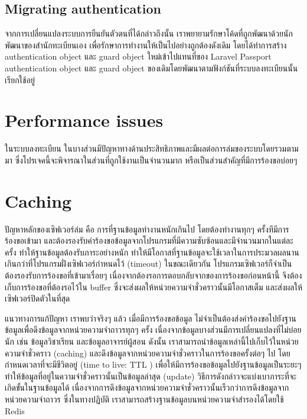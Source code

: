 \subsection{Migrating authentication}
จากการเปลี่ยนแปลงระบบการยืนยันตัวตนที่ได้กล่าวถึงนั้น เราพยายามรักษาโค้ดที่ถูกพัฒนาด้วยนักพัฒนาของสำนักทะเบียนเอง เพื่อรักษาการทำงานให้เป็นไปอย่างถูกต้องดังเดิม โดยได้ทำการสร้าง authentication object และ guard object ใหม่เข้าไปแทนที่ของ Laravel Passport authentication object และ guard object ของเดิมโดยพัฒนาตามฟังก์ชันที่ระบบลงทะเบียนนั้นเรียกใช้อยู่

\section{Performance issues}
ในระบบลงทะเบียน ในบางส่วนมีปัญหาทางด้านประสิทธิภาพและมีผลต่อการล่มของระบบโดยรวมตามมา ซึ่งโปรเจคนี้จะพิจารณาในส่วนที่ถูกใช้งานเป็นจำนวนมาก หรือเป็นส่วนสำคัญที่มีการร้องขอบ่อยๆ

\section{Caching}

ปัญหาหลักของเซิฟเวอร์ล่ม คือ การที่ฐานข้อมูลทำงานหนักเกินไป โดยต้องทำงานทุกๆ ครั้งทีมีการร้องขอเข้ามา และต้องรองรับคำร้องขอข้อมูลจากโปรแกรมที่มีความซับซ้อนและมีจำนวนมากในแต่ละครั้ง ทำให้ฐานข้อมูลต้องรับภาระอย่างหนัก 
ทำให้มีโอกาสที่ฐานข้อมูลจะใช้เวลาในการประมวลผลนานเกินกว่าที่โปรแกรมฝั่งเซิฟเวอร์กำหนดไว้ (timeout) ในขณะเดียวกัน โปรแกรมเซิฟเวอร์ก็จำเป็นต้องรองรับการร้องขอที่เข้ามาเรื่อยๆ เนื่องจากต้องรอการตอบกลับจากของการร้องขอก่อนหน้านี้ จึงต้องเก็บการร้องขอที่ต้องรอไว้ใน buffer ซึ่งจะส่งผลให้หน่วยความจำชั่วคราวนั้นมีโอกาสเต็ม และส่งผลให้เซิฟเวอร์ปิดตัวในที่สุด

แนวทางการแก้ปัญหา เราพบว่าจริงๆ แล้ว เมื่อมีการร้องขอข้อมูล ไม่จำเป็นต้องส่งคำร้องขอไปยังฐานข้อมูลเพื่อดึงข้อมูลจากหน่วยความจำถาวรทุกๆ ครั้ง เนื่องจากข้อมูลบางส่วนมีการเปลี่ยนแปลงที่ไม่บ่อยนัก เช่น ข้อมูลวิชาเรียน และข้อมูลอาจารย์ผู้สอน ดังนั้น เราสามารถนำข้อมูลเหล่านี้ไปเก็บไว้ในหน่วยความจำชั่วคราว (caching) และดึงข้อมูลจากหน่วยความจำชั่วคราวในการร้องขอครั้งต่อๆ ไป โดยกำหนดเวลาที่จะมีชีวิตอยู่ (time to live: TTL \cite{ttl}) เพื่อให้มีการร้องขอข้อมูลไปยังฐานข้อมูลเป็นระยะๆ ทำให้ข้อมูลที่อยู่ในความจำชั่วคราวนั้นเป็นข้อมูลล่าสุด (update) วิธีการดังกล่าวจะแบ่งเบาภาระที่จะเกิดขั้นในฐานข้อมูลได้ เนื่องจากการดึงข้อมูลจากหน่วยความจำชั่วคราวนั้นเร็วกว่าการดึงข้อมูลจากหน่วยความจำถาวร ซึ่งในทางปฏิบัติ เราสามารถสร้างฐานข้อมูลบนหน่วยความจำสำรองได้โดยใช้ Redis \cite{redis}

